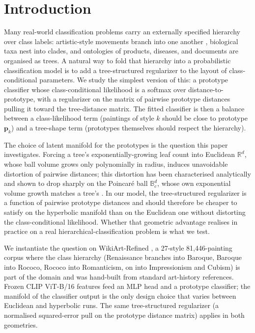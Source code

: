 \section{Introduction}
\label{sec:intro}

Many real-world classification problems carry an externally specified
hierarchy over class labels: artistic-style movements branch into one
another \citep{tan2019wikiart}, biological taxa nest into clades, and
ontologies of products, diseases, and documents are organised as
trees. A natural way to fold that hierarchy into a probabilistic
classification model is to add a tree-structured regularizer to the
layout of class-conditional parameters. We study the simplest version
of this: a prototype classifier whose class-conditional likelihood is
a softmax over distance-to-prototype, with a regularizer on the
matrix of pairwise prototype distances pulling it toward the
tree-distance matrix. The fitted classifier is then a balance between
a class-likelihood term (paintings of style $k$ should be close to
prototype $\mathbf{p}_k$) and a tree-shape term (prototypes
themselves should respect the hierarchy).

The choice of latent manifold for the prototypes is the question this
paper investigates. Forcing a tree's exponentially-growing leaf count
into Euclidean $\mathbb{R}^d$, whose ball volume grows only
polynomially in radius, induces unavoidable distortion of pairwise
distances; this distortion has been characterised analytically and
shown to drop sharply on the Poincar\'e ball $\mathbb{B}^d_c$, whose
own exponential volume growth matches a tree's
\citep{nickel2017poincare,sala2018representation}. In our model, the
tree-structured regularizer is a function of pairwise prototype
distances and should therefore be cheaper to satisfy on the
hyperbolic manifold than on the Euclidean one without distorting the
class-conditional likelihood. Whether that geometric advantage
realises in practice on a real hierarchical-classification problem is
what we test.

We instantiate the question on WikiArt-Refined \citep{tan2019wikiart},
a 27-style 81{,}446-painting corpus where the class hierarchy
(Renaissance branches into Baroque, Baroque into Rococo, Rococo into
Romanticism, on into Impressionism and Cubism) is part of the domain
and was hand-built from standard art-history references. Frozen
CLIP ViT-B/16 features \citep{radford2021clip} feed an MLP head and a
prototype classifier; the manifold of the classifier output is the
only design choice that varies between Euclidean and hyperbolic runs.
The same tree-structured regularizer (a normalised squared-error
pull on the prototype distance matrix) applies in both geometries.

